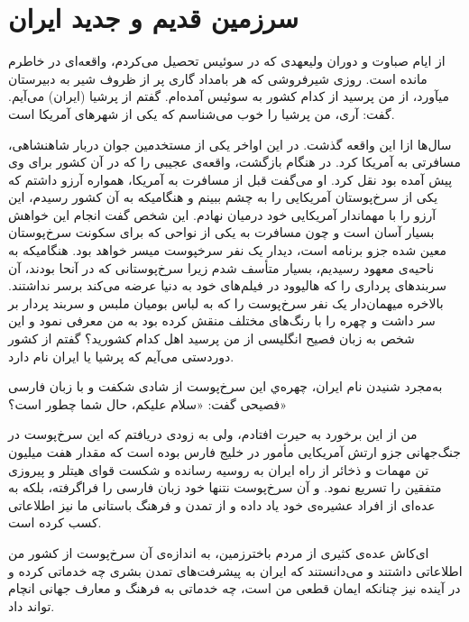\chapter{سرزمین قدیم و جدید ایران}
از ایام صباوت و دوران ولیعهدی که در سوئیس تحصیل می‌کردم، واقعه‌ای در خاطرم مانده است. روزی شیرفروشی که هر بامداد گاری پر از ظروف شیر به دبیرستان میآورد، از من پرسید از کدام کشور به سوئیس آمده‌ام. گفتم از پرشیا (ایران) می‌آیم. گفت: آری، من پرشیا را خوب می‌شناسم که یکی از شهرهای آمریکا است. 
\par
سال‌ها ازا این واقعه گذشت. در این اواخر یکی از مستخدمین جوان دربار شاهنشاهی، مسافرتی به آمریکا کرد. در هنگام بازگشت، واقعه‌ی عجیبی را که در آن کشور برای وی پیش آمده بود نقل کرد. او می‌گفت قبل از مسافرت به آمریکا، همواره آرزو  داشتم که یکی از سرخ‌پوستان آمریکایی را به چشم ببینم و هنگامیکه به آن کشور رسیدم، این آرزو را با مهماندار آمریکایی خود درمیان نهادم. این شخص گفت انجام این خواهش بسیار آسان است و چون مسافرت به یکی از نواحی که برای سکونت سرخ‌پوستان معین شده جزو برنامه است، دیدار یک‌ نفر سرخپوست میسر خواهد بود. 
هنگامیکه به ناحیه‌ی معهود رسیدیم، بسیار متأسف شدم زیرا سرخ‌پوستانی  که در آنحا بودند، آن سربندهای پرداری را که هالیوود در فیلم‌های خود به دنیا عرضه می‌کند برسر نداشتند. بالاخره میهمان‌دار یک نفر سرخ‌پوست را که به لباس بومیان ملبس و سربند پردار بر سر داشت و چهره را با رنگ‌های مختلف منقش کرده بود به من معرفی نمود و این شخص به زبان فصیح انگلیسی از من پرسید اهل کدام کشورید؟ گفتم از کشور دوردستی می‌آیم که پرشیا یا ایران نام دارد.  
\par
به‌مجرد شنیدن نام ایران، چهره‌ي این سرخ‌پوست از شادی شکفت و با زبان فارسی فصیحی گفت: «سلام علیکم، حال شما چطور است؟»
\par
من از این برخورد به حیرت افتادم، ولی به زودی دریافتم که این سرخ‌پوست در جنگ‌‌جهانی جزو ارتش آمریکایی مأمور در خلیج فارس بوده است که مقدار هفت میلیون تن مهمات و ذخائر از راه ایران به روسیه رسانده و شکست قوای هیتلر و پیروزی متفقین را تسریع نمود. و آن سرخ‌پوست نتنها خود زبان فارسی را فراگرفته، بلکه به عده‌ای از افراد عشیره‌ی خود یاد داده و از تمدن و فرهنگ باستانی ما نیز اطلاعاتی کسب کرده است.
\par 
ای‌کاش عده‌ی کثیری از مردم باخترزمین، به اندازه‌ی آن سرخ‌پوست از کشور من اطلاعاتی داشتند و می‌دانستند که ایران به پیشرفت‌های تمدن بشری چه خدماتی کرده و در آینده نیز چنانکه ایمان قطعی من است، چه خدماتی به فرهنگ و معارف جهانی انچام تواند داد. 
